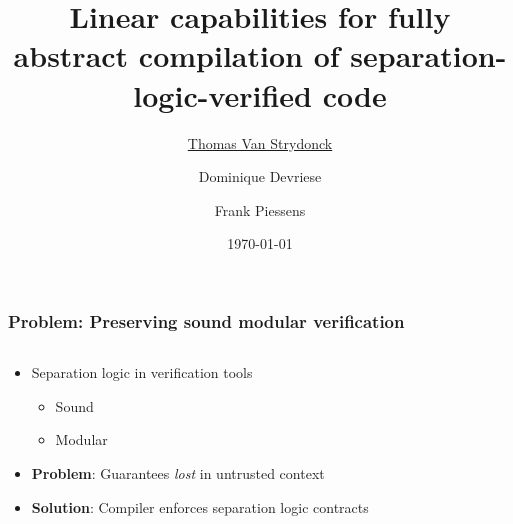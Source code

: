 \documentclass{beamer}
\title[Linear Capability Verification]{Linear capabilities for fully abstract
compilation of separation-logic-verified code} %
\author[Thomas Van Strydonck]{\underline{Thomas Van Strydonck} \and Dominique Devriese \and Frank Piessens} %
\institute[KU Leuven] %
{
KU Leuven \\ %
\medskip
\textit{thomas.vanstrydonck@cs.kuleuven.be} %
}
\date{\today} %
\begin{document}


\begin{frame}
\titlepage %
\end{frame}

\begin{frame}
\frametitle{Problem: Preserving sound modular verification}

\begin{columns}
\begin{column}{0.65\textwidth}
\begin{itemize}
\item Separation logic in verification tools
	\begin{itemize}
	\item Sound
	\item Modular
	\end{itemize}
\item \textbf{Problem}: Guarantees \emph{lost} in untrusted context %
\item \textbf{Solution}: Compiler enforces separation logic contracts  %
\end{itemize}
\end{column}
\begin{column}{0.37\textwidth}
\def\firstcircle{(0,0) circle (2cm)}
\def\secondcircle{(0,0) circle (1.3cm)}

\end{column}
\end{columns}
\end{frame}

\end{document}
